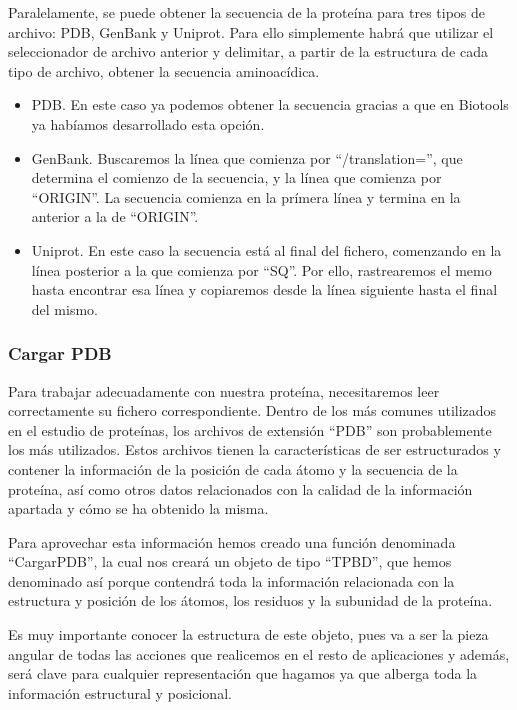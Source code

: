 \documentclass[12pt]{article}
\begin{document}
Paralelamente, se puede obtener la secuencia de la proteína para tres tipos de archivo: PDB, GenBank y Uniprot. Para ello simplemente habrá que utilizar el seleccionador de archivo anterior y delimitar, a partir de la estructura de cada tipo de archivo, obtener la secuencia aminoacídica.
\begin{itemize}
\item PDB. En este caso ya podemos obtener la secuencia gracias a que en Biotools ya habíamos desarrollado esta opción.
\item GenBank. Buscaremos la línea que comienza por ``/translation='', que determina el comienzo de la secuencia, y la línea que comienza por ``ORIGIN''. La secuencia comienza en la prímera línea y termina en la  anterior a la de ``ORIGIN''.
\item Uniprot. En este caso la secuencia está al final del fichero, comenzando en la línea posterior a la que comienza por ``SQ''. Por ello, rastrearemos el memo hasta encontrar esa línea y copiaremos desde la línea siguiente hasta el final del mismo.
\end{itemize}

\subsubsection{Cargar PDB}
Para trabajar adecuadamente con nuestra proteína, necesitaremos leer correctamente su fichero correspondiente. Dentro de los más comunes utilizados en el estudio de proteínas, los archivos de extensión ``PDB'' son probablemente los más utilizados. Estos archivos tienen la características de ser estructurados y contener la información de la posición de cada átomo y la secuencia de la proteína, así como otros datos relacionados con la calidad de la información apartada y cómo se ha obtenido la misma.
\newline

Para aprovechar esta información hemos creado una función denominada ``CargarPDB'', la cual nos creará un objeto de tipo ``TPBD'', que hemos denominado así porque contendrá toda la información relacionada con la estructura y posición de los átomos, los residuos y la subunidad de la proteína.
\newline

Es muy importante conocer la estructura de este objeto, pues va a ser la pieza angular de todas las acciones que realicemos en el resto de aplicaciones y además, será clave para cualquier representación que hagamos ya que alberga toda la información estructural y posicional.
\newline
\end{document}
